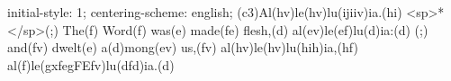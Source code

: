 initial-style: 1;
centering-scheme: english;
(c3)Al(hv)le(hv)lu(ijiiv)ia.(hi) <sp>*</sp>(;) The(f) Word(f) was(e) made(fe) flesh,(d) al(ev)le(ef)lu(d)ia:(d) (;) and(fv) dwelt(e) a(d)mong(ev) us,(fv) al(hv)le(hv)lu(hih)ia,(hf) al(f)le(gxfegFEfv)lu(dfd)ia.(d)